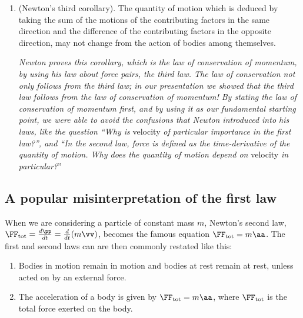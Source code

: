 \documentclass{article}
\begin{document}
\begin{enumerate}
	\textit{This is just our reaction force theorem. Though, do recall that we didn't need to take our reaction force theorem as axiom, and instead derived it from a more primitive ``force pair axiom''.}
		
	\textit{More importantly, notice that none of Newton's laws covers the most fundamental thing- the law of conservation of momentum. Instead, Newton derived the law of conservation of momentum as a consequence of the third law. (We showed that, assuming the ``force pair axiom'', it is equivalent to the third law.)}
	
	\item (Newton's third corollary). The quantity of motion which is deduced by taking the sum of the motions of the contributing factors in the same direction and the difference of the contributing factors in
	the opposite direction, may not change from the action of bodies among themselves.
	
	\textit{Newton proves this corollary, which is the law of conservation of momentum, by using his law about force pairs, the third law. The law of conservation not only follows from the third law; in our presentation we showed that the third law follows from the law of conservation of momentum! By stating the law of conservation of momentum first, and by using it as our fundamental starting point, we were able to avoid the confusions that Newton introduced into his laws, like the question ``Why is} velocity \textit{of particular importance in the first law?'', and ``In the second law, force is defined as the time-derivative of the quantity of motion. Why does the quantity of motion depend on} velocity \textit{in particular?}''
\end{enumerate}

\subsection*{A popular misinterpretation of the first law}

When we are considering a particle of constant mass $m$, Newton's second law, $\FF_{\text{tot}} = \frac{d\pp}{dt} = \frac{d}{dt}(m\vv)$, becomes the famous equation $\FF_{\text{tot}} = m\aa$. The first and second laws can are then commonly restated like this:

\begin{enumerate}
	\item Bodies in motion remain in motion and bodies at rest remain at rest, unless acted on by an external force.
	\item The acceleration of a body is given by $\FF_{\text{tot}} = m\aa$, where $\FF_{\text{tot}}$ is the total force exerted on the body.
\end{enumerate}
\end{document}
